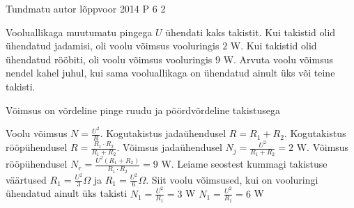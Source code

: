 {Tundmatu autor} %
{lõppvoor} %
{2014} %
{P 6} %
{2} %
{

\ifStatement
Vooluallikaga muutumatu pingega $U$ ühendati kaks takistit. Kui takistid olid ühendatud jadamisi, oli voolu võimsus vooluringis $2$ W. Kui takistid olid ühendatud rööbiti, oli voolu võimsus vooluringis $9$ W. Arvuta voolu võimsus nendel kahel juhul, kui sama vooluallikaga on ühendatud ainult üks või teine takisti.
\fi

\ifHint
Võimsus on võrdeline pinge ruudu ja pöördvõrdeline takistusega
\fi

\ifSolution
Voolu võimsus $N = \frac{U^2}{R}$.
Kogutakistus jadaühendusel $R = R_1 + R_2$.
Kogutakistus rööpühendusel $R = \frac{R_1 \cdot R_2}{R_1 + R_2}$.
Võimsus jadaühendusel $N_j = \frac{U^2}{R_1 + R_2} = 2$ W.
Võimsus rööpühendusel $N_r = \frac{U^2(R_1 + R_2)}{R_1 \cdot R_2} = 9$ W.
Leiame seostest kummagi takistuse väärtused $R_1 = \frac{U^2}{3} \Omega$ ja $R_1 = \frac{U^2}{6} \Omega$.
Siit voolu võimsused, kui on vooluringi ühendatud ainult üks takisti
$N_1 = \frac{U^2}{R_1} = 3$ W 
$N_1 = \frac{U^2}{R_1} = 6$ W
\fi
}